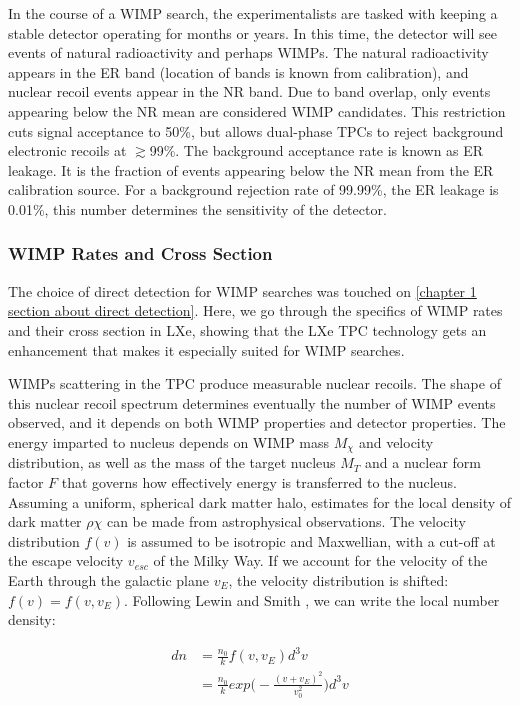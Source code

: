 In the course of a \ac{WIMP} search, the experimentalists are tasked with keeping a stable detector operating for months or years. In this time, the detector will see events of natural radioactivity and perhaps \ac{WIMP}s. The natural radioactivity appears in the \ac{ER} band (location of bands is known from calibration), and nuclear recoil events appear in the \ac{NR} band. Due to band overlap, only events appearing below the \ac{NR} mean are considered \ac{WIMP} candidates. This restriction cuts signal acceptance to 50\%, but allows dual-phase \ac{TPC}s to reject background electronic recoils at $\gtrsim$99\%. The background acceptance rate is known as \ac{ER} leakage. It is the fraction of events appearing below the \ac{NR} mean from the \ac{ER} calibration source. For a background rejection rate of 99.99\%, the \ac{ER} leakage is 0.01\%, this number determines the sensitivity of the detector.


\subsubsection{WIMP Rates and Cross Section}
\label{sec:wimp_rates}
The choice of direct detection for \ac{WIMP} searches was touched on \ref{chapter 1 section about direct detection}. Here, we go through the specifics of \ac{WIMP} rates and their cross section in \ac{LXe}, showing that the \ac{LXe} \ac{TPC} technology gets an enhancement that makes it especially suited for \ac{WIMP} searches.

\ac{WIMP}s scattering in the \ac{TPC} produce measurable nuclear recoils. The shape of this nuclear recoil spectrum determines eventually the number of \ac{WIMP} events observed, and it depends on both \ac{WIMP} properties and detector properties. The energy imparted to nucleus depends on \ac{WIMP} mass $M_{\chi}$ and velocity distribution, as well as the mass of the target nucleus $M_{T}$ and a nuclear form factor $F$ that governs how effectively energy is transferred to the nucleus. Assuming a uniform, spherical dark matter halo, estimates for the local density of dark matter $\rho{\chi}$ can be made from astrophysical observations. The velocity distribution $f(v)$ is assumed to be isotropic and Maxwellian, with a cut-off at the escape velocity $v_{esc}$ of the Milky Way. If we account for the velocity of the Earth through the galactic plane $v_{E}$, the velocity distribution is shifted: $f(v) = f(v,v_{E})$. Following Lewin and Smith \cite{Lewin1996}, we can write the local number density:


\begin{equation}
\begin{split}
dn &= \frac{n_{0}}{k} f(v, v_{E}) d^{3}v \\
     &= \frac{n_{0}}{k} exp \big( - \frac{(v + v_{E})^{2} }{ v_{0}^{2}} \big) d^{3}v 
\end{split}
\end{equation}

